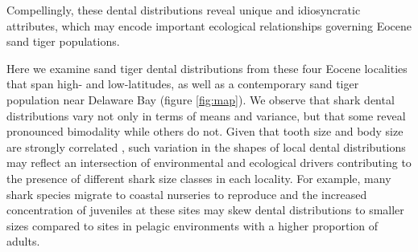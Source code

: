 \documentclass[]{rsos}%
\begin{document}
Compellingly, these dental distributions reveal unique and idiosyncratic attributes, which may encode important ecological relationships governing Eocene sand tiger populations.


Here we examine sand tiger dental distributions from these four Eocene localities that span high- and low-latitudes, as well as a contemporary sand tiger population near Delaware Bay (figure \ref{fig:map}).
We observe that shark dental distributions vary not only in terms of means and variance, but that some reveal pronounced bimodality while others do not.
Given that tooth size and body size are strongly correlated \cite{Shimada2002, Shimada2004, Shimada2007}, such variation in the shapes of local dental distributions may reflect an intersection of environmental and ecological drivers contributing to the presence of different shark size classes in each locality.
For example, many shark species migrate to coastal nurseries to reproduce \cite{Jorgensen2010,Macdonald2021} and the increased concentration of juveniles at these sites may skew dental distributions to smaller sizes compared to sites in pelagic environments with a higher proportion of adults.
\end{document}
